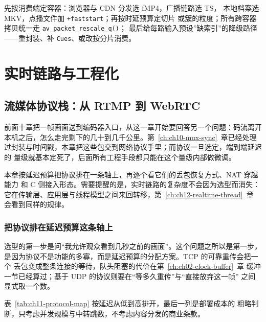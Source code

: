 \documentclass[12pt,a4paper,fontset=fandol]{ctexbook}
\newcommand{\Fn}[1]{\texttt{#1()}}
\newcommand{\Tp}[1]{\texttt{#1}}
\newcommand{\Lang}[1]{\textsf{#1}}
\newcommand{\CL}{\Lang{C}}
\begin{document}
\begin{bestpractice}[title={封装层设计检查单}]
  先按消费端定容器：浏览器与 CDN 分发选 fMP4，广播链路选 TS，
  本地档案选 MKV，点播文件加 \Tp{+faststart}；再按时延预算定切片
  或簇的粒度；所有跨容器拷贝统一走 \Fn{av\_packet\_rescale\_q}；
  最后给每路输入预设''缺索引''的降级路径——重封装、补
  \Tp{Cues}、或改按分片消费。
\end{bestpractice}

\part{实时链路与工程化}

\chapter{流媒体协议栈：从 RTMP 到 WebRTC}
\label{ch:ch11-streaming}

前面十章把一帧画面送到编码器入口，从这一章开始要回答另一个问题：码流离开
本机之后，怎么走完剩下的几十到几千公里。第~\ref{ch:ch10-mux-sync}~章已经处理
过封装与时间戳，本章把这些包交到网络协议手里；而协议一旦选定，端到端延迟的
量级就基本定死了，后面所有工程手段都只能在这个量级内部做微调。

本章按延迟预算把协议排在一条轴上，再逐个看它们的丢包恢复方式、NAT 穿越能力
和 \CL{} 侧接入形态。需要提醒的是，实时链路的复杂度不会因为选型而消失：
它在传输层、应用层与线程模型之间来回转移，第~\ref{ch:ch12-realtime-thread}~章
会看到同样的规律。

\section{把协议排在延迟预算这条轴上}

选型的第一步是问``我允许观众看到几秒之前的画面''。这个问题之所以是第一步，
是因为协议不是功能的多寡，而是延迟预算的分配方案。TCP 的可靠重传会把一个
丢包变成整条连接的等待，队头阻塞的代价在第~\ref{ch:ch02-clock-buffer}~章
缓冲一节已经算过；基于 UDP 的协议则要在``等多久重传''与``直接放弃这一帧''
之间显式取一个数。

表~\ref{tab:ch11-protocol-map} 按延迟从低到高排开，最后一列是部署成本的
粗略判断，只考虑并发规模与中转跳数，不考虑内容分发的商业条款。
\end{document}
